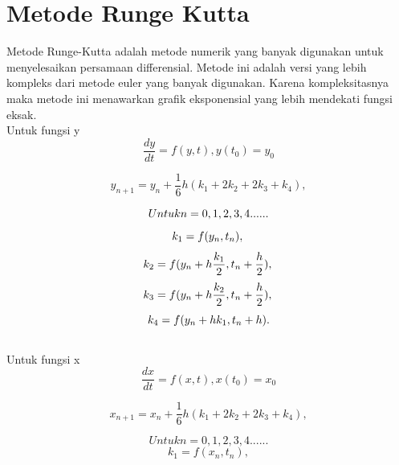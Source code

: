 \section{Metode Runge Kutta}\label{sec:metodeperhitungan}
\hspace{0.5cm} Metode Runge-Kutta adalah metode numerik yang banyak digunakan untuk menyelesaikan persamaan differensial. Metode ini adalah versi yang lebih kompleks dari metode euler yang banyak digunakan. Karena kompleksitasnya maka metode ini menawarkan grafik eksponensial yang lebih mendekati fungsi eksak.\\
Untuk fungsi y
\begin{equation}
\dfrac{dy}{dt} =f(y,t) , y(t_0)=y_0
\end{equation}

\begin{equation}
y_{n+1} = y_{n} + \dfrac{1}{6}h (k_1+2k_2+2k_3+k_4),
\end{equation}

\begin{equation}
Untuk n = 0,1,2,3,4 ......\\
\end{equation}
\begin{equation}
k_1 = f(y_{n} ,t_{n}),\\
\end{equation}
\begin{equation}
k_2 = f(y_{n}+h\dfrac{k_1}{2} ,t_{n}+\dfrac{h}{2}),\\
\end{equation}
\begin{equation}
k_3 = f(y_{n}+h\dfrac{k_2}{2} ,t_{n}+\dfrac{h}{2}),\\
\end{equation}
\begin{equation}
k_4 = f(y_{n}+hk_{1} ,t_{n}+h).\\
\end{equation}
\\
Untuk fungsi x
\begin{equation}
\dfrac{dx}{dt} =f(x,t) , x(t_0)=x_0
\end{equation}

\begin{equation}
x_{n+1} = x_{n} + \dfrac{1}{6}h (k_1+2k_2+2k_3+k_4),
\end{equation}

\begin{equation}
Untuk n = 0,1,2,3,4 ......
\end{equation}
\begin{equation}
k_1 = f(x_{n} ,t_{n}),
\end{equation}

